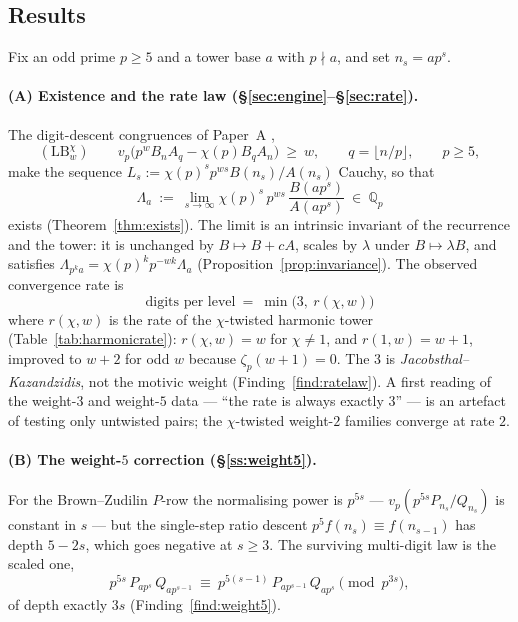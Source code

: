 \documentclass[11pt,reqno]{article}
\newcommand{\Qp}{\mathbb{Q}_p}
\newcommand{\vp}{v_p}
\newcommand{\floor}[1]{\lfloor #1 \rfloor}
\theoremstyle{plain}
\theoremstyle{definition}
\theoremstyle{remark}
\numberwithin{equation}{section}
\begin{document}
\subsection{Results}\label{ss:results}

Fix an odd prime $p\ge5$ and a tower base $a$ with $p\nmid a$, and set
$n_s=ap^s$.

\paragraph{(A) Existence and the rate law (\S\ref{sec:engine}--\S\ref{sec:rate}).}
The digit-descent congruences of Paper~A \cite{PaperA-inprep},
\[
  (\mathrm{LB}_w^\chi)\qquad
  \vp\bigl(p^{w}B_nA_q-\chi(p)B_qA_n\bigr)\ \ge\ w,\qquad q=\floor{n/p},\qquad p\ge5,
\]
make the sequence $L_s:=\chi(p)^{s}p^{ws}B(n_s)/A(n_s)$ Cauchy, so that
\[
  \Lambda_a\ :=\ \lim_{s\to\infty}\chi(p)^{s}\,p^{ws}\,\frac{B(ap^s)}{A(ap^s)}\ \in\ \Qp
\]
exists (Theorem~\ref{thm:exists}).  The limit is an intrinsic invariant of the
recurrence and the tower: it is unchanged by $B\mapsto B+cA$, scales by
$\lambda$ under $B\mapsto\lambda B$, and satisfies
$\Lambda_{p^ka}=\chi(p)^{k}p^{-wk}\Lambda_a$
(Proposition~\ref{prop:invariance}).  The
observed convergence rate is
\[
  \boxed{\ \text{digits per level}\ =\ \min\bigl(3,\ r(\chi,w)\bigr)\ }
\]
where $r(\chi,w)$ is the rate of the $\chi$-twisted harmonic tower
(Table~\ref{tab:harmonicrate}): $r(\chi,w)=w$ for $\chi\ne1$, and $r(1,w)=w+1$,
improved to $w+2$ for odd $w$ because $\zeta_p(w+1)=0$.  The $3$ is
\emph{Jacobsthal--Kazandzidis}, not the motivic weight
(Finding~\ref{find:ratelaw}).  A first reading of the weight-$3$ and weight-$5$
data --- ``the rate is always exactly $3$'' --- is an artefact of testing only
untwisted pairs; the $\chi$-twisted weight-$2$ families converge at rate $2$.

\paragraph{(B) The weight-$5$ correction (\S\ref{ss:weight5}).}
For the Brown--Zudilin $P$-row the normalising power is $p^{5s}$ --- $\vp(p^{5s}P_{n_s}/Q_{n_s})$
is constant in $s$ --- but the single-step ratio descent $p^5f(n_s)\equiv
f(n_{s-1})$ has depth $5-2s$, which goes negative at $s\ge3$.  The surviving
multi-digit law is the scaled one,
\[
  p^{5s}\,P_{ap^{s}}\,Q_{ap^{s-1}}\ \equiv\ p^{5(s-1)}\,P_{ap^{s-1}}\,Q_{ap^{s}}
  \pmod{p^{3s}},
\]
of depth exactly $3s$ (Finding~\ref{find:weight5}).
\end{document}
